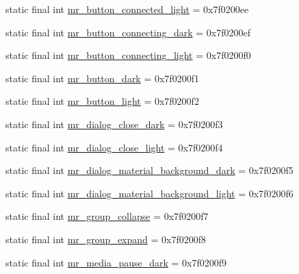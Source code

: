 \begin{CompactItemize}
\item 
static final int \hyperlink{classandroid_1_1support_1_1v7_1_1mediarouter_1_1_r_1_1drawable_d9a0240996c30d56995c4362490f32e0}{mr\_\-button\_\-connected\_\-light} = 0x7f0200ee
\item 
static final int \hyperlink{classandroid_1_1support_1_1v7_1_1mediarouter_1_1_r_1_1drawable_a11f97636e9712ac1cabe5d78f1507bc}{mr\_\-button\_\-connecting\_\-dark} = 0x7f0200ef
\item 
static final int \hyperlink{classandroid_1_1support_1_1v7_1_1mediarouter_1_1_r_1_1drawable_7fd0120bde711a3f28e7ac441a3e273f}{mr\_\-button\_\-connecting\_\-light} = 0x7f0200f0
\item 
static final int \hyperlink{classandroid_1_1support_1_1v7_1_1mediarouter_1_1_r_1_1drawable_23189b62417213a1579e11775e8477f2}{mr\_\-button\_\-dark} = 0x7f0200f1
\item 
static final int \hyperlink{classandroid_1_1support_1_1v7_1_1mediarouter_1_1_r_1_1drawable_c0592eccc455fe43f6a76505071bf546}{mr\_\-button\_\-light} = 0x7f0200f2
\item 
static final int \hyperlink{classandroid_1_1support_1_1v7_1_1mediarouter_1_1_r_1_1drawable_fc4e3e399790a92df57b6ebf6f309823}{mr\_\-dialog\_\-close\_\-dark} = 0x7f0200f3
\item 
static final int \hyperlink{classandroid_1_1support_1_1v7_1_1mediarouter_1_1_r_1_1drawable_1773272ed113e7bd59b0d4370c565259}{mr\_\-dialog\_\-close\_\-light} = 0x7f0200f4
\item 
static final int \hyperlink{classandroid_1_1support_1_1v7_1_1mediarouter_1_1_r_1_1drawable_2678dd2c6e7e9a9f5e4f1893cfcaf7de}{mr\_\-dialog\_\-material\_\-background\_\-dark} = 0x7f0200f5
\item 
static final int \hyperlink{classandroid_1_1support_1_1v7_1_1mediarouter_1_1_r_1_1drawable_ccdf520124e54b46ce6b8ea850c96dd7}{mr\_\-dialog\_\-material\_\-background\_\-light} = 0x7f0200f6
\item 
static final int \hyperlink{classandroid_1_1support_1_1v7_1_1mediarouter_1_1_r_1_1drawable_a65b1ee3f65494b46729eddd4536305b}{mr\_\-group\_\-collapse} = 0x7f0200f7
\item 
static final int \hyperlink{classandroid_1_1support_1_1v7_1_1mediarouter_1_1_r_1_1drawable_3361bb6cb433c9128b029c8563970285}{mr\_\-group\_\-expand} = 0x7f0200f8
\item 
static final int \hyperlink{classandroid_1_1support_1_1v7_1_1mediarouter_1_1_r_1_1drawable_8dac340ce2c40f84de6cd68f2580e094}{mr\_\-media\_\-pause\_\-dark} = 0x7f0200f9

\end{CompactItemize}
